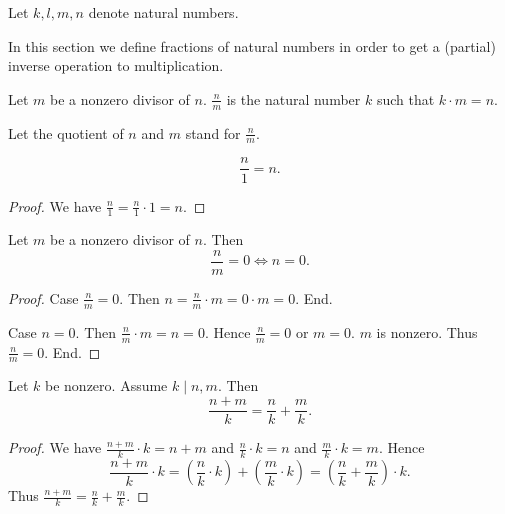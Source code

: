 \documentclass[../../arithmetic.ftl.tex]{subfiles}
\begin{document}
  \begin{forthel}
    Let $k,l,m,n$ denote natural numbers.
  \end{forthel}


  \noindent In this section we define fractions of natural numbers in order to get a (partial) inverse operation to multiplication.

  \begin{forthel}
    \begin{definition}
      Let $m$ be a nonzero divisor of $n$.
      $\frac{n}{m}$ is the natural number $k$ such that $k \cdot m = n$.
    \end{definition}

    Let the quotient of $n$ and $m$ stand for $\frac{n}{m}$.

    \begin{proposition}\label{Arithmetic_03_05_479904}
      \[ \frac{n}{1} = n. \]
    \end{proposition}
    \begin{proof}
      We have $\frac{n}{1} = \frac{n}{1} \cdot 1 = n$.
    \end{proof}

    \begin{proposition}\label{Arithmetic_03_05_471851}
      Let $m$ be a nonzero divisor of $n$.
      Then \[ \frac{n}{m} = 0 \iff n = 0. \]
    \end{proposition}
    \begin{proof}
      Case $\frac{n}{m} = 0$.
        Then $n = \frac{n}{m} \cdot m = 0 \cdot m = 0$.
      End.

      Case $n = 0$.
        Then $\frac{n}{m} \cdot m = n = 0$.
        Hence $\frac{n}{m} = 0$ or $m = 0$.
        $m$ is nonzero.
        Thus $\frac{n}{m} = 0$.
      End.
    \end{proof}

    \begin{proposition}\label{Arithmetic_03_05_363442}
      Let $k$ be nonzero.
      Assume $k \mid n,m$.
      Then \[ \frac{n + m}{k} = \frac{n}{k} + \frac{m}{k}. \]
    \end{proposition}
    \begin{proof}
      We have $\frac{n + m}{k} \cdot k = n + m$ and $\frac{n}{k} \cdot k = n$ and $\frac{m}{k} \cdot k = m$.
      Hence
      \[  \frac{n + m}{k} \cdot k
          = (\frac{n}{k} \cdot k) + (\frac{m}{k} \cdot k)
          = (\frac{n}{k} + \frac{m}{k}) \cdot k. \]
      Thus $\frac{n + m}{k} = \frac{n}{k} + \frac{m}{k}$.
    \end{proof}


\end{forthel}
\end{document}

